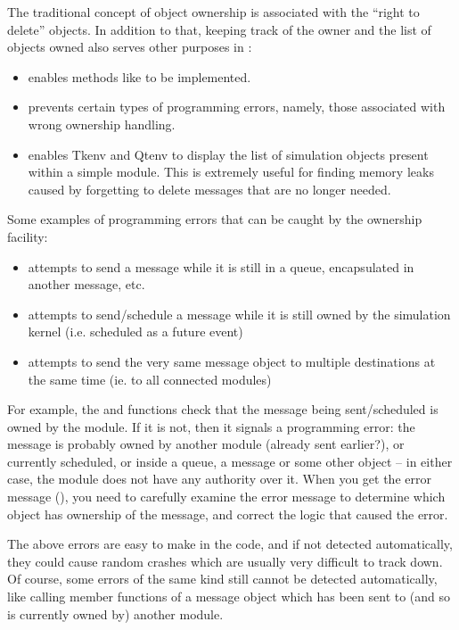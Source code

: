The traditional concept of object ownership is associated with
the ``right to delete'' objects. In addition to that,
keeping track of the owner and the list of objects owned also
serves other purposes in {\opp}:

\begin{itemize}
    \item{enables methods like  to be implemented.}

    \item{prevents certain types of programming errors, namely,
    those associated with wrong ownership handling.}

    \item{enables Tkenv and Qtenv to display the list of simulation objects
    present within a simple module. This is extremely useful for finding
    memory leaks caused by forgetting to delete messages that are
    no longer needed.}
\end{itemize}

Some examples of programming errors that can be caught
by the ownership facility:

\begin{itemize}
    \item{attempts to send a message while it is still in a queue,
    encapsulated in another message, etc.}

    \item{attempts to send/schedule a message while it is still owned
    by the simulation kernel (i.e. scheduled as a future event)}

    \item{attempts to send the very same message object to multiple
    destinations at the same time (ie. to all connected modules)}
\end{itemize}

For example, the  and  functions check
that the message being sent/scheduled is owned by the module.
If it is not, then it signals a programming error: the message is probably
owned by another module (already sent earlier?), or currently scheduled, or
inside a queue, a message or some other object -- in either case, the
module does not have any authority over it. When you get the error message
(), you need to carefully examine the error
message to determine which object has ownership of the message, and correct
the logic that caused the error.

The above errors are easy to make in the code, and if not detected
automatically, they could cause random crashes which are usually very
difficult to track down. Of course, some errors of the same kind still
cannot be detected automatically, like calling member functions of a
message object which has been sent to (and so is currently owned by) another
module.


